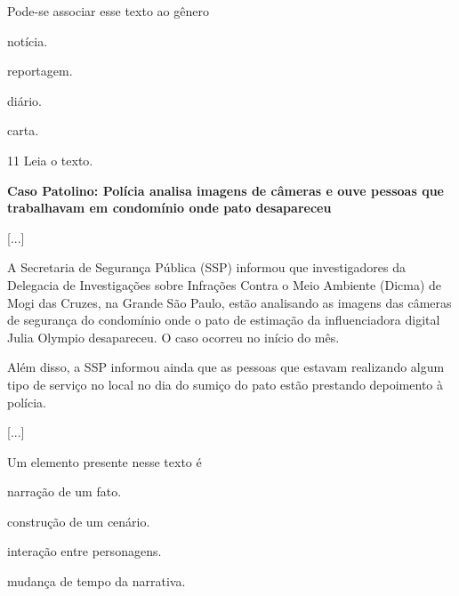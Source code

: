 Pode-se associar esse texto ao gênero

\begin{escolha}
\item notícia.

\item reportagem.

\item diário.

\item carta.
\end{escolha}

\num{11} Leia o texto.

\begin{myquote}
\textbf{Caso Patolino: Polícia analisa imagens de câmeras e ouve pessoas que trabalhavam em condomínio onde pato desapareceu}

{[}...{]}

A Secretaria de Segurança Pública (SSP) informou que investigadores da
Delegacia de Investigações sobre Infrações Contra o Meio Ambiente
(Dicma) de
Mogi
das Cruzes, na Grande São Paulo, estão analisando as imagens das
câmeras de segurança do condomínio onde
o
pato de estimação da influenciadora digital Julia Olympio desapareceu.
O caso ocorreu no início do mês.

Além disso, a SSP informou ainda que as pessoas que estavam realizando
algum tipo de serviço no local no dia do sumiço do pato estão prestando
depoimento à polícia.

{[}...{]}

\end{myquote}

Um elemento presente nesse texto é

\begin{escolha}
\item narração de um fato.

\item construção de um cenário.

\item interação entre personagens.

\item mudança de tempo da narrativa.
\end{escolha}


